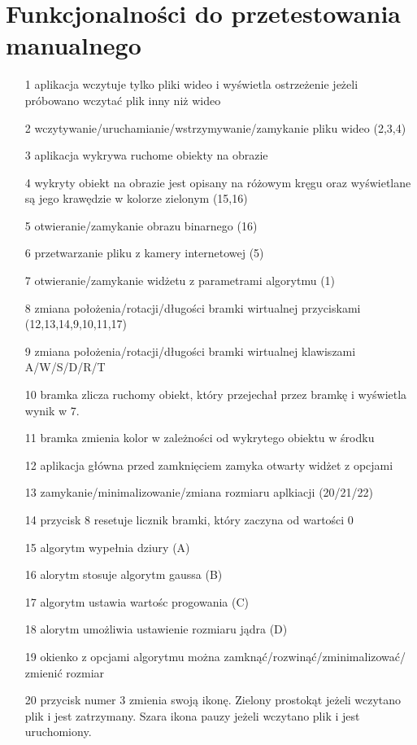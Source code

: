 \documentclass[11pt,a4paper]{article}
\begin{document}
\section{Funkcjonalności do przetestowania manualnego}
\begin{enumerate}
\item[1] aplikacja wczytuje tylko pliki wideo i wyświetla ostrzeżenie jeżeli próbowano wczytać plik inny niż wideo
\item[2] wczytywanie/uruchamianie/wstrzymywanie/zamykanie pliku wideo (2,3,4)
\item[3] aplikacja wykrywa ruchome obiekty na obrazie
\item[4] wykryty  obiekt na obrazie jest opisany na  różowym kręgu oraz wyświetlane są jego krawędzie w kolorze zielonym (15,16)
\item[5] otwieranie/zamykanie obrazu binarnego (16)
\item[6] przetwarzanie pliku z kamery internetowej (5)
\item[7] otwieranie/zamykanie widżetu z parametrami algorytmu (1)
\item[8] zmiana położenia/rotacji/długości bramki wirtualnej przyciskami (12,13,14,9,10,11,17)
\item[9] zmiana położenia/rotacji/długości bramki wirtualnej klawiszami A/W/S/D/R/T
\item[10] bramka zlicza ruchomy obiekt, który przejechał przez bramkę i wyświetla wynik w 7.
\item[11] bramka zmienia kolor w zależności od wykrytego obiektu w środku
\item[12] aplikacja główna przed zamknięciem zamyka otwarty widżet z opcjami
\item[13] zamykanie/minimalizowanie/zmiana rozmiaru aplkiacji (20/21/22)
\item[14] przycisk 8 resetuje licznik bramki, który zaczyna od wartości 0
\item[15] algorytm wypełnia dziury (A)
\item[16] alorytm stosuje algorytm gaussa (B)
\item[17] algorytm ustawia wartośc progowania (C)
\item[18] alorytm umożliwia ustawienie rozmiaru jądra (D)
\item[19] okienko z opcjami algorytmu można zamknąć/rozwinąć/zminimalizować/ zmienić rozmiar
\item[20] przycisk numer 3 zmienia swoją ikonę. Zielony prostokąt jeżeli wczytano plik i jest zatrzymany. Szara ikona pauzy jeżeli wczytano plik i jest uruchomiony.
\end{enumerate}
\end{document}
